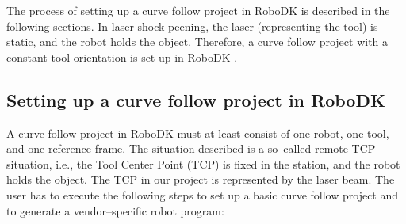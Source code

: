 The process of setting up a curve follow project in RoboDK is described in the following sections. In laser shock peening, the laser (representing the tool) is static, and the robot holds the object. Therefore, a curve follow project with a constant tool orientation is set up in RoboDK \cite{machiningproject}.

\subsection{Setting up a curve follow project in RoboDK}
\label{sec:setting_up}

A curve follow project in RoboDK must at least consist of one robot, one tool, and one reference frame. The situation described is a so--called remote TCP situation, i.e., the Tool Center Point (TCP) is fixed in the station, and the robot holds the object. The TCP in our project is represented by the laser beam. 
The user has to execute the following steps to set up a basic curve follow project and to generate a vendor--specific robot program: 

